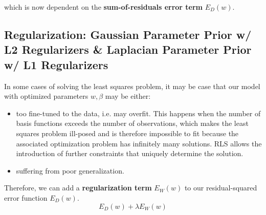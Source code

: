   which is now dependent on the \textbf{sum-of-residuals error term} $E_D(w)$.

\subsection{Regularization: Gaussian Parameter Prior w/ L2 Regularizers \& Laplacian Parameter Prior w/ L1 Regularizers}

  In some cases of solving the least squares problem, it may be case that our model with optimized parameters $w, \beta$ may be either:
  \begin{itemize}
    \item too fine-tuned to the data, i.e. may overfit. This happens when the number of basis functions exceeds the number of observations, which makes the least squares problem ill-posed and is therefore impossible to fit because the associated optimization problem has infinitely many solutions. RLS allows the introduction of further constraints that uniquely determine the solution.
    \item suffering from poor generalization.
  \end{itemize}

  Therefore, we can add a \textbf{regularization term} $E_W (w)$ to our residual-squared error function $E_D (w)$.
  \begin{equation}
    E_D (w) + \lambda E_W (w)
  \end{equation}


